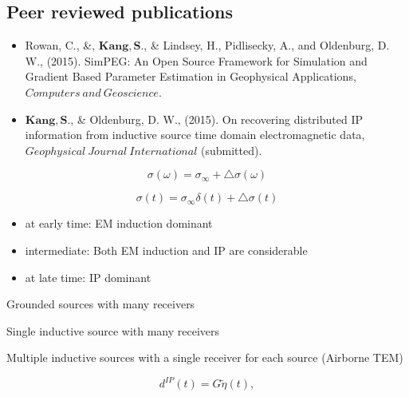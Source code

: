 \documentclass[letterpaper,11pt]{article}
\newcommand{\siginf}{\sigma_\infty}
\newcommand{\dsig}{\triangle\sigma}
\newcommand{\peta}{\tilde{\eta}}
\newcommand{\dip}{d^{IP}}
\begin{document}
\subsection{Peer reviewed publications}
\begin{itemize}
\item
Rowan, C., \&, $\mathbf{Kang, S.}$, \& Lindsey, H., Pidlisecky, A., and Oldenburg, D. W., (2015). SimPEG: An Open Source Framework for Simulation and Gradient Based Parameter Estimation in Geophysical Applications, $\mathit Computers \ and \ Geoscience$.
\item 
$\mathbf{Kang, S.}$, \& Oldenburg, D. W., (2015). On recovering distributed IP information from inductive source time domain electromagnetic data,  $\mathit Geophysical \ Journal \ International$ (submitted).
\end{itemize}
\newpage

% 


\begin{equation}
  \sigma(\omega) = \siginf + \dsig(\omega)
  \label{eq:sigmaomega}
\end{equation}

\begin{equation}
  \sigma(t) = \siginf\delta(t) + \dsig(t)
  \label{eq:sigmat}
\end{equation}

\begin{itemize}
  \item at early time: EM induction dominant
  \item intermediate: Both EM induction and IP are considerable
  \item at late time: IP dominant
\end{itemize}
\begin{item}
  \item Grounded sources with many receivers
  \item Single inductive source with many receivers
  \item Multiple inductive sources with a single receiver for each source (Airborne TEM)
\end{item}
\begin{equation}
  \dip(t) = G\peta(t),
  \label{eq:linearIPdatum}
\end{equation}
\end{document}

